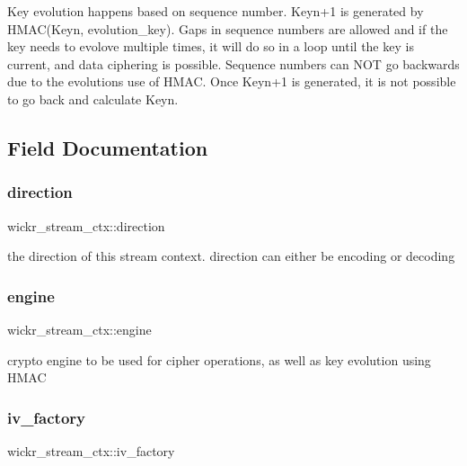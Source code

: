 Key evolution happens based on sequence number. Keyn+1 is generated by H\+M\+A\+C(\+Keyn, evolution\+\_\+key). Gaps in sequence numbers are allowed and if the key needs to evolove multiple times, it will do so in a loop until the key is current, and data ciphering is possible. Sequence numbers can N\+OT go backwards due to the evolution\textquotesingle{}s use of H\+M\+AC. Once Keyn+1 is generated, it is not possible to go back and calculate Keyn. 

\subsection{Field Documentation}
\mbox{\label{structwickr__stream__ctx_a34c622c3ca61348321261ee7a9c3ff91}} 
\subsubsection{\texorpdfstring{direction}{direction}}
{\footnotesize\ttfamily wickr\+\_\+stream\+\_\+ctx\+::direction}

the direction of this stream context. direction can either be encoding or decoding \mbox{\label{structwickr__stream__ctx_a14ef322bbeec579ded7f35c5aeb0d3fa}} 
\subsubsection{\texorpdfstring{engine}{engine}}
{\footnotesize\ttfamily wickr\+\_\+stream\+\_\+ctx\+::engine}

crypto engine to be used for cipher operations, as well as key evolution using H\+M\+AC \mbox{\label{structwickr__stream__ctx_a67c5066e87dbdc026358563daa51f174}} 
\subsubsection{\texorpdfstring{iv\_factory}{iv\_factory}}
{\footnotesize\ttfamily wickr\+\_\+stream\+\_\+ctx\+::iv\+\_\+factory}

